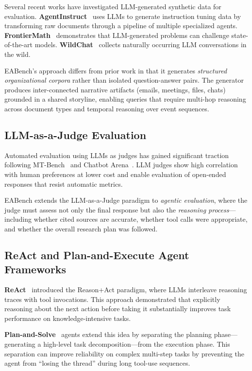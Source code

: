 \documentclass[10pt,twocolumn]{article}
\begin{document}
Several recent works have investigated LLM-generated synthetic data for
evaluation.
\textbf{AgentInstruct}~\citep{mitra2024agentinstruct} uses LLMs to generate
instruction tuning data by transforming raw documents through a pipeline of
multiple specialized agents.
\textbf{FrontierMath}~\citep{glazer2024frontiermath} demonstrates that
LLM-generated problems can challenge state-of-the-art models.
\textbf{WildChat}~\citep{zhao2024wildchat} collects naturally occurring LLM
conversations in the wild.

EABench's approach differs from prior work in that it generates
\emph{structured organizational corpora} rather than isolated question-answer
pairs.  The generator produces inter-connected narrative artifacts (emails,
meetings, files, chats) grounded in a shared storyline, enabling queries that
require multi-hop reasoning across document types and temporal reasoning over
event sequences.

\subsection{LLM-as-a-Judge Evaluation}

Automated evaluation using LLMs as judges has gained significant traction
following MT-Bench~\citep{zheng2023judging} and Chatbot
Arena~\citep{chiang2024chatbot}.  LLM judges show high correlation with human
preferences at lower cost and enable evaluation of open-ended responses that
resist automatic metrics.

EABench extends the LLM-as-a-Judge paradigm to \emph{agentic evaluation},
where the judge must assess not only the final response but also the
\emph{reasoning process}---including whether cited sources are accurate,
whether tool calls were appropriate, and whether the overall research plan was
followed.

\subsection{ReAct and Plan-and-Execute Agent Frameworks}

\textbf{ReAct}~\citep{yao2022react} introduced the Reason+Act paradigm, where
LLMs interleave reasoning traces with tool invocations.  This approach
demonstrated that explicitly reasoning about the next action before taking it
substantially improves task performance on knowledge-intensive tasks.

\textbf{Plan-and-Solve}~\citep{wang2023plansolve} agents extend this idea by
separating the planning phase---generating a high-level task decomposition---from
the execution phase.  This separation can improve reliability on complex
multi-step tasks by preventing the agent from ``losing the thread'' during long
tool-use sequences.
\end{document}
